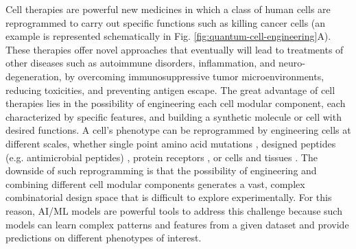 \documentclass{article}
\begin{document}
Cell therapies are powerful new medicines in which a class of human cells are reprogrammed to carry out specific functions such as killing cancer cells (an example is represented schematically in Fig. \ref{fig:quantum-cell-engineering}A). These therapies offer novel approaches that eventually will lead to treatments of other diseases such as autoimmune disorders, inflammation, and neuro-degeneration, by overcoming immunosuppressive tumor microenvironments, reducing toxicities, and preventing antigen escape. The great advantage of cell therapies lies in the possibility of engineering each cell modular component, each characterized by specific features, and building a synthetic molecule or cell with desired functions. A cell's phenotype can be reprogrammed by engineering cells at different scales, whether single point amino acid mutations \cite{guedan2020single}, designed peptides (e.g. antimicrobial peptides) \cite{das2021accelerated}, protein receptors \cite{krause1998antigen,roybal2016engineering,tousley2023co,roybal2016precision}, or cells and tissues \cite{martinez2022scaling,harrison2017assembly,shahbazi2018deconstructing}. The downside of such reprogramming is that the possibility of engineering and combining different cell modular components generates a vast, complex combinatorial design space that is difficult to explore experimentally. For this reason, AI/ML models are powerful tools to address this challenge because such models can learn complex patterns and features from a given dataset and provide predictions on different phenotypes of interest.
\end{document}

